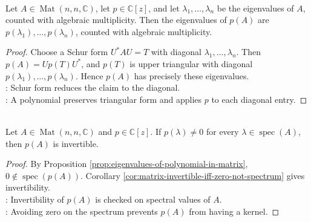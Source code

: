 \begin{proposition} \label{prop:eigenvalues-of-polynomial-in-matrix} \\
Let $A\in\operatorname{Mat}(n,n,\mathbb{C})$, let $p\in\mathbb{C}[z]$, and let $\lambda_1,\ldots,\lambda_n$ be the eigenvalues of $A$, counted with algebraic multiplicity. Then the eigenvalues of $p(A)$ are $p(\lambda_1),\ldots,p(\lambda_n)$, counted with algebraic multiplicity.
\begin{proof}
Choose a Schur form $U^*AU=T$ with diagonal $\lambda_1,\ldots,\lambda_n$. Then $p(A)=Up(T)U^*$, and $p(T)$ is upper triangular with diagonal $p(\lambda_1),\ldots,p(\lambda_n)$. Hence $p(A)$ has precisely these eigenvalues.\\
: Schur form reduces the claim to the diagonal.\\
: A polynomial preserves triangular form and applies $p$ to each diagonal entry.
\end{proof}
\end{proposition}

\begin{corollary} \label{cor:polynomial-in-matrix-invertible-spectrum-test} \\
Let $A\in\operatorname{Mat}(n,n,\mathbb{C})$ and $p\in\mathbb{C}[z]$. If $p(\lambda)\neq0$ for every $\lambda\in\operatorname{spec}(A)$, then $p(A)$ is invertible.
\begin{proof}
By Proposition \ref{prop:eigenvalues-of-polynomial-in-matrix}, $0\notin\operatorname{spec}(p(A))$. Corollary \ref{cor:matrix-invertible-iff-zero-not-spectrum} gives invertibility.\\
: Invertibility of $p(A)$ is checked on spectral values of $A$.\\
: Avoiding zero on the spectrum prevents $p(A)$ from having a kernel.
\end{proof}
\end{corollary}

